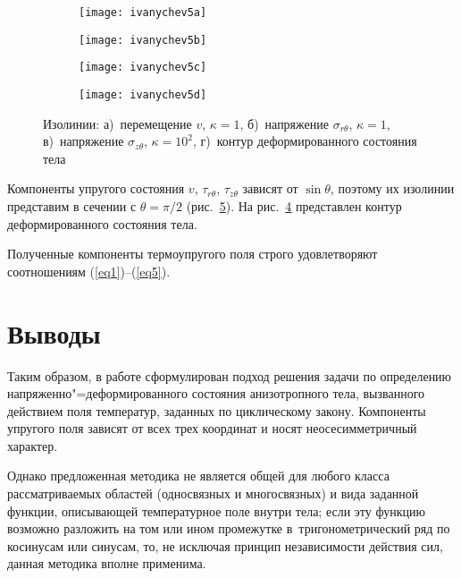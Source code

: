\documentclass[press]{vestnik}
\begin{document}
\begin{figure}
\centering
\begin{subfigure}{.39\textwidth}
\texttt{[image: ivanychev5a]}
\caption{}
\label{fig5a}
\end{subfigure}
\qquad
\begin{subfigure}{.39\textwidth}
\texttt{[image: ivanychev5b]}
\caption{}
\label{fig5b}
\end{subfigure}
\begin{subfigure}{.39\textwidth}
\texttt{[image: ivanychev5c]}
\caption{}
\label{fig5c}
\end{subfigure}
\qquad
\begin{subfigure}{.39\textwidth}\centering
\texttt{[image: ivanychev5d]}
\caption{}
\label{fig5d}
\end{subfigure}
\caption{Изолинии: а)~перемещение $v$, $\kappa =1$, б)~напряжение $\sigma 
_{r\theta }$, $\kappa =1$, в)~напряжение $\sigma_{z\theta }$, $\kappa 
=10^{2}$, г)~контур деформированного состояния тела}
\label{fig5}
\end{figure}

Компоненты упругого состояния $v$, $\tau_{r\theta } $, $\tau_{z\theta } $ 
зависят от $\sin \theta $, поэтому их изолинии представим в сечении с 
$\theta = \pi/2$ (рис.~\ref{fig5}). На рис.~\ref{fig5d} представлен контур 
деформированного состояния тела.



Полученные компоненты термоупругого поля строго удовлетворяют соотношениям 
(\ref{eq1})--(\ref{eq5}).

\section*{Выводы}

Таким образом, в работе сформулирован подход решения задачи по определению 
напряженно"=деформированного состояния анизотропного тела, вызванного 
действием поля температур, заданных по циклическому закону. Компоненты 
упругого поля зависят от всех трех координат и носят неосесимметричный 
характер.

Однако предложенная методика не является общей для любого класса 
рассматриваемых областей (односвязных и многосвязных) и вида заданной 
функции, описывающей температурное поле внутри тела; если эту 
функцию возможно разложить на том или ином промежутке в~тригонометрический 
ряд по косинусам или синусам, то, не исключая принцип независимости действия 
сил, данная методика вполне применима.
\end{document}

